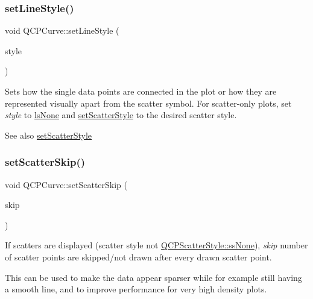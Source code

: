 \subsubsection{\texorpdfstring{set\+Line\+Style()}{setLineStyle()}}
{\footnotesize\ttfamily void Q\+C\+P\+Curve\+::set\+Line\+Style (\begin{DoxyParamCaption}\item[{\hyperlink{class_q_c_p_curve_a2710e9f79302152cff794c6e16cc01f1}{Q\+C\+P\+Curve\+::\+Line\+Style}}]{style }\end{DoxyParamCaption})}

Sets how the single data points are connected in the plot or how they are represented visually apart from the scatter symbol. For scatter-\/only plots, set {\itshape style} to \hyperlink{class_q_c_p_curve_a2710e9f79302152cff794c6e16cc01f1aec1601a191cdf0b4e761c4c66092cc48}{ls\+None} and \hyperlink{class_q_c_p_curve_a55e43b44709bf50a35500644988aa706}{set\+Scatter\+Style} to the desired scatter style.

\begin{DoxySeeAlso}{See also}
\hyperlink{class_q_c_p_curve_a55e43b44709bf50a35500644988aa706}{set\+Scatter\+Style} 
\end{DoxySeeAlso}
\mbox{\label{class_q_c_p_curve_a97dbfecd497e972d5f2162615e6da5be}} 
\subsubsection{\texorpdfstring{set\+Scatter\+Skip()}{setScatterSkip()}}
{\footnotesize\ttfamily void Q\+C\+P\+Curve\+::set\+Scatter\+Skip (\begin{DoxyParamCaption}\item[{int}]{skip }\end{DoxyParamCaption})}

If scatters are displayed (scatter style not \hyperlink{class_q_c_p_scatter_style_adb31525af6b680e6f1b7472e43859349abd144c291ca274f77053ec68cab6c022}{Q\+C\+P\+Scatter\+Style\+::ss\+None}), {\itshape skip} number of scatter points are skipped/not drawn after every drawn scatter point.

This can be used to make the data appear sparser while for example still having a smooth line, and to improve performance for very high density plots.

